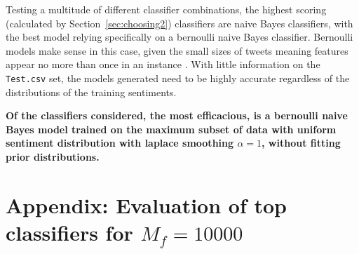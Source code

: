 \documentclass[11pt]{article}
\begin{document}
Testing a multitude of different classifier combinations, the highest scoring (calculated by Section~\ref{sec:choosing2}) classifiers are naive Bayes classifiers, 
with the best model relying specifically on a bernoulli naive Bayes classifier.
Bernoulli models make sense in this case, given the small sizes of tweets meaning features appear no more than once in an instance \cite{tweetlen}.
With little information on the \texttt{Test.csv} set, 
the models generated need to be highly accurate regardless of the distributions of the training sentiments.

\textbf{Of the classifiers considered, the most efficacious, 
is a bernoulli naive Bayes model trained on the maximum subset of data with uniform sentiment distribution with laplace smoothing $\alpha = 1$, 
without fitting prior distributions.}




\section{Appendix: Evaluation of top classifiers for $M_f = 10000$}\label{sec:appa}

\end{document}
